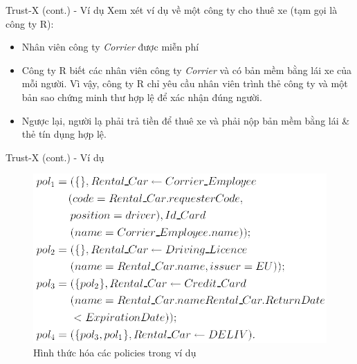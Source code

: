 \documentclass[11pt]{beamer}
\begin{document}
\begin{frame}{Trust-X (cont.) - Ví dụ}
Xem xét ví dụ về một công ty cho thuê xe (tạm gọi là công ty R):
\begin{itemize}
\item Nhân viên công ty \emph{Corrier} được miễn phí
\item Công ty R biết các nhân viên công ty \emph{Corrier} và có bản mềm bằng lái xe của mỗi người. Vì vậy, công ty R chỉ yêu cầu nhân viên trình thẻ công ty và một bản sao chứng minh thư hợp lệ để xác nhận đúng người.
\item Ngược lại, người lạ phải trả tiền để thuê xe và phải nộp bản mềm bằng lái \& thẻ tín dụng hợp lệ.
\end{itemize}
\end{frame}

\begin{frame}{Trust-X (cont.) - Ví dụ}
\begin{figure}
\centering
\includegraphics[scale=.5]{img/policy.png}
\caption{Hình thức hóa các policies trong ví dụ}
\label{fig:policy-formal}
\end{figure}
\end{frame}
\end{document}
